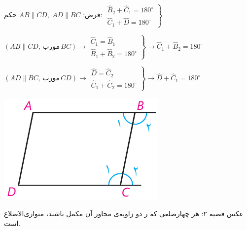 \documentclass[12pt, a4paper]{book}
\begin{document}
\begin{minipage}{.75\textwidth}
	 فرض: 
	$AB \parallel CD, \; AD \parallel BC$
	\hfill حکم:
	$ \left. \begin{array}{rrr}
		\widehat{B}_2 + \widehat{C}_1 = 180^{\circ} \\ \widehat{C}_1 + \widehat{D} = 180^{\circ}
	\end{array} \right\}$
	\begin{flushleft}
		$(AB \parallel CD, \, \text{مورب} \, BC ) \rightarrow \left. \begin{array}{rll}
			  \widehat{C}_1 = \widehat{B}_1 \\ \widehat{B}_1 + \widehat{B}_2 = 180^{\circ} 
		\end{array} \right\} \rightarrow \widehat{C}_1 + \widehat{B}_2 = 180^{\circ} $
	
		$(AD \parallel BC, \, \text{مورب} \, CD ) \rightarrow \left. \begin{array}{rll}
			\widehat{D} = \widehat{C}_2 \\ \widehat{C}_1 + \widehat{C}_2 = 180^{\circ}
		\end{array} \right\} \rightarrow \widehat{D} + \widehat{C}_1 = 180^{\circ}$
	\end{flushleft}
\end{minipage}
\begin{minipage}{.25\textwidth}
	\begin{flushleft}
		\includegraphics[scale=0.8]{"Shapes/Fasl - 3/Dars 1/qazie 2.pdf"}
	\end{flushleft}
\end{minipage}

{\semibold عکس قضیه ۲}: هر چهارضلعی که ر دو زاویه‌ی مجاور آن مکمل‌ باشند، متوازی‌الاضلاع است.
\end{document}
